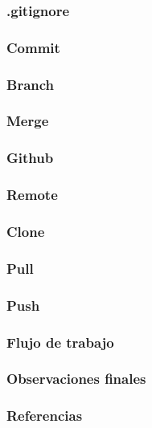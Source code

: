 \documentclass{beamer}
\begin{document}
\begin{frame}
\frametitle{.gitignore}
\end{frame}

\begin{frame}
\frametitle{Commit}
\end{frame}

\begin{frame}
\frametitle{Branch}
\end{frame}

\begin{frame}
\frametitle{Merge}
\end{frame}

\begin{frame}
\frametitle{Github}
\end{frame}

\begin{frame}
\frametitle{Remote}
\end{frame}

\begin{frame}
\frametitle{Clone}
\end{frame}

\begin{frame}
\frametitle{Pull}
\end{frame}

\begin{frame}
\frametitle{Push}
\end{frame}

\begin{frame}
\frametitle{Flujo de trabajo}
\end{frame}

\begin{frame}
\frametitle{Observaciones finales}
\end{frame}

\begin{frame}
  \frametitle{Referencias}
\end{frame}
\end{document}

